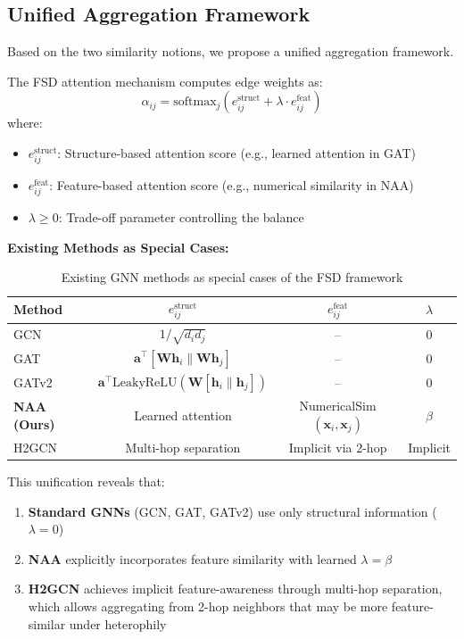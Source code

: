 \subsection{Unified Aggregation Framework}

Based on the two similarity notions, we propose a unified aggregation framework.

\begin{definition}
\label{def:fsd_attention}
The FSD attention mechanism computes edge weights as:
\begin{equation}
\alpha_{ij} = \text{softmax}_j\left(e_{ij}^{\text{struct}} + \lambda \cdot e_{ij}^{\text{feat}}\right)
\end{equation}
where:
\begin{itemize}
    \item $e_{ij}^{\text{struct}}$: Structure-based attention score (e.g., learned attention in GAT)
    \item $e_{ij}^{\text{feat}}$: Feature-based attention score (e.g., numerical similarity in NAA)
    \item $\lambda \geq 0$: Trade-off parameter controlling the balance
\end{itemize}
\end{definition}

\textbf{Existing Methods as Special Cases:}

\begin{table}[h]
\centering
\caption{Existing GNN methods as special cases of the FSD framework}
\label{tab:fsd_special_cases}
\small
\begin{tabular}{lccc}
\toprule
\textbf{Method} & $e_{ij}^{\text{struct}}$ & $e_{ij}^{\text{feat}}$ & $\lambda$ \\
\midrule
GCN & $1/\sqrt{d_i d_j}$ & -- & 0 \\
GAT & $\mathbf{a}^\top[\mathbf{W}\mathbf{h}_i \| \mathbf{W}\mathbf{h}_j]$ & -- & 0 \\
GATv2 & $\mathbf{a}^\top \text{LeakyReLU}(\mathbf{W}[\mathbf{h}_i \| \mathbf{h}_j])$ & -- & 0 \\
\textbf{NAA (Ours)} & Learned attention & NumericalSim$(\mathbf{x}_i, \mathbf{x}_j)$ & $\beta$ \\
H2GCN & Multi-hop separation & Implicit via 2-hop & Implicit \\
\bottomrule
\end{tabular}
\end{table}

This unification reveals that:
\begin{enumerate}
    \item \textbf{Standard GNNs} (GCN, GAT, GATv2) use only structural information ($\lambda = 0$)
    \item \textbf{NAA} explicitly incorporates feature similarity with learned $\lambda = \beta$
    \item \textbf{H2GCN} achieves implicit feature-awareness through multi-hop separation, which allows aggregating from 2-hop neighbors that may be more feature-similar under heterophily
\end{enumerate}

